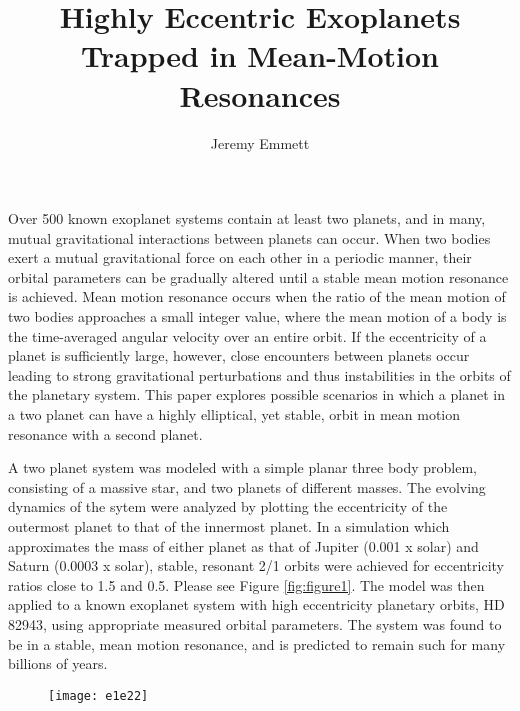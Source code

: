 \documentclass{article}
\begin{document}
 

\title{Highly Eccentric Exoplanets Trapped in Mean-Motion Resonances}
\author{Jeremy Emmett}
\maketitle
	Over 500 known exoplanet systems contain at least two planets, and in many, mutual gravitational interactions
between planets can occur. When two bodies exert a mutual gravitational force on each other in a periodic 
manner, their orbital parameters can be gradually altered until a stable mean motion resonance is achieved. 
Mean motion resonance occurs when the ratio of the mean motion of two bodies approaches a small integer value, 
where the mean motion of a body is the time-averaged angular velocity over an entire orbit. If the eccentricity 
of a planet is sufficiently large, however, close encounters between planets occur leading to strong gravitational 
perturbations and thus instabilities in the orbits of the planetary system. This paper explores possible scenarios in
which a planet in a two planet can have a highly elliptical, yet stable, orbit in mean motion resonance with a second
planet.
\par
A two planet system was modeled with a simple planar three body problem, consisting of a massive star, and two 
planets of different masses. The evolving dynamics of the sytem were analyzed by plotting the eccentricity of the 
outermost planet to that of the innermost planet. In a simulation which approximates the mass of either planet as that
of Jupiter (0.001 x solar) and Saturn (0.0003 x solar), stable, resonant 2/1 orbits were achieved for eccentricity ratios 
close to 1.5 and 0.5. Please see Figure \ref{fig:figure1}. The model was then applied to a known exoplanet system with high eccentricity planetary orbits, 
HD 82943, using appropriate measured orbital parameters. The system was found to be in a stable, mean motion resonance,
and is predicted to remain such for many billions of years.
\begin{figure}
\label{figure1}
\texttt{[image: e1e22]}
\caption{}
\end{figure}

{}

\end{document}
